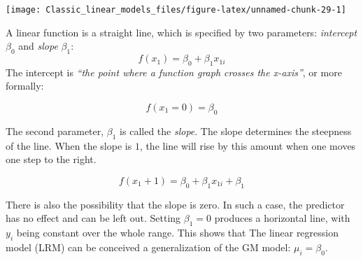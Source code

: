 \documentclass[]{svmono}
\newenvironment{Shaded}{\begin{snugshade}}{\end{snugshade}}
\newcommand{\KeywordTok}[1]{\textcolor[rgb]{0.13,0.29,0.53}{\textbf{#1}}}
\newcommand{\DataTypeTok}[1]{\textcolor[rgb]{0.13,0.29,0.53}{#1}}
\newcommand{\DecValTok}[1]{\textcolor[rgb]{0.00,0.00,0.81}{#1}}
\newcommand{\FloatTok}[1]{\textcolor[rgb]{0.00,0.00,0.81}{#1}}
\newcommand{\StringTok}[1]{\textcolor[rgb]{0.31,0.60,0.02}{#1}}
\newcommand{\OperatorTok}[1]{\textcolor[rgb]{0.81,0.36,0.00}{\textbf{#1}}}
\newcommand{\NormalTok}[1]{#1}
\begin{document}
\begin{Shaded}
\end{Shaded}

\texttt{[image: Classic\_linear\_models\_files/figure-latex/unnamed-chunk-29-1]}

A linear function is a straight line, which is specified by two
parameters: \emph{intercept} \(\beta_0\) and \emph{slope} \(\beta_1\):
\[f(x_1) = \beta_0 + \beta_1x_{1i}\] The intercept is \emph{``the point
where a function graph crosses the x-axis''}, or more formally:

\[f(x_1 = 0) = \beta_0\]

The second parameter, \(\beta_1\) is called the \emph{slope}. The slope
determines the steepness of the line. When the slope is \(1\), the line
will rise by this amount when one moves one step to the right.

\[f(x_1 + 1) = \beta_0 + \beta_1x_{1i} + \beta_1\]

There is also the possibility that the slope is zero. In such a case,
the predictor has no effect and can be left out. Setting \(\beta_1 = 0\)
produces a horizontal line, with \(y_i\) being constant over the whole
range. This shows that The linear regression model (LRM) can be
conceived a generalization of the GM model: \(\mu_i = \beta_0\).
\end{document}
